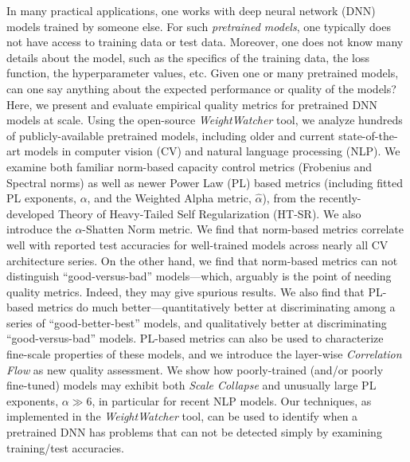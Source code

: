 
In many practical applications, one works with deep neural network (DNN) models trained by someone else.
For such \emph{pretrained models}, one typically does not have access to training data or test data.
Moreover, one does not know many details about the model, such as the specifics of the training data, the loss function, the hyperparameter values, etc.
Given one or many pretrained models, can one say anything about the expected performance or quality of the models?
Here, we present and evaluate empirical quality metrics for pretrained DNN models at scale.
Using the open-source \emph{WeightWatcher} tool, we analyze hundreds of publicly-available pretrained models, including older and current state-of-the-art models in computer vision (CV) and natural language processing (NLP).
We examine both familiar norm-based capacity control metrics (Frobenius and Spectral norms) as well as newer Power Law (PL) based metrics (including fitted PL exponents, $\alpha$, and the Weighted Alpha metric, $\hat{\alpha}$), from the recently-developed Theory of Heavy-Tailed Self Regularization (HT-SR).
We also introduce the $\alpha$-Shatten Norm metric.
We find that norm-based metrics correlate well with reported test accuracies for well-trained models across nearly all CV architecture series.
On the other hand, we find that norm-based metrics can not distinguish ``good-versus-bad'' models---which, arguably is the point of needing quality metrics.  
Indeed, they may give spurious results.
We also find that PL-based metrics do much better---quantitatively better at discriminating among a series of ``good-better-best'' models, and qualitatively better at discriminating ``good-versus-bad'' models.
PL-based metrics can also be used to characterize fine-scale properties of these models, and we introduce the layer-wise \emph{Correlation Flow} as new quality assessment.
We show how poorly-trained (and/or poorly fine-tuned) models may exhibit both \emph{Scale Collapse} and unusually large PL exponents, $\alpha\gg 6$, in particular for recent NLP models.
Our techniques, as implemented in the \emph{WeightWatcher} tool, can be used to identify when a pretrained DNN has problems that can not be detected simply by examining training/test accuracies.


